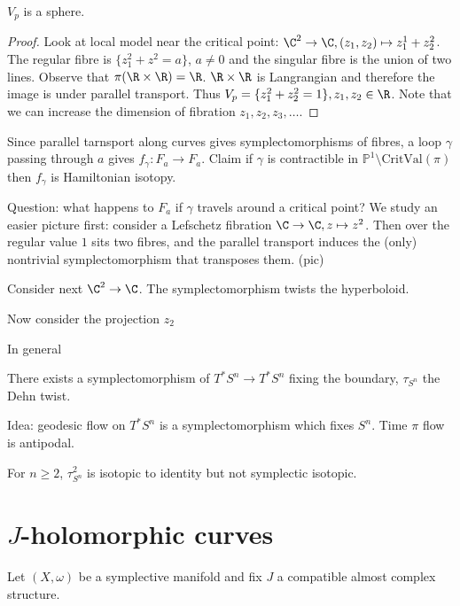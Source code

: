 \documentclass[a4paper]{article}
\renewcommand*{\P}{\mathbb{P}}
\begin{document}
\begin{proposition}
  \(V_p\) is a sphere.
\end{proposition}

\begin{proof}
  Look at local model near the critical point: \(\C^2 \to \C, (z_1, z_2) \mapsto z_1^1 + z_2^2\). The regular fibre is \(\{z_1^2 + z^2 = a\}\), \(a \ne 0\) and the singular fibre is the union of two lines. Observe that \(\pi(\R \times \R) = \R\). \(\R \times \R\) is Langrangian and therefore the image is under parallel transport. Thus \(V_p = \{z_1^2 + z_2^2 = 1\}, z_1, z_2 \in \R\). Note that we can increase the dimension of fibration \(z_1, z_2, z_3, \dots\).
\end{proof}

Since parallel tarnsport along curves gives symplectomorphisms of fibres, a loop \(\gamma\) passing through \(a\) gives \(f_\gamma: F_a \to F_a\). Claim if \(\gamma\) is contractible in \(\P^1 \setminus \mathrm{CritVal}(\pi)\) then \(f_\gamma\) is Hamiltonian isotopy.

Question: what happens to \(F_a\) if \(\gamma\) travels around a critical point? We study an easier picture first: consider a Lefschetz fibration \(\C \to \C, z \mapsto z^2\). Then over the regular value \(1\) sits two fibres, and the parallel transport induces the (only) nontrivial symplectomorphism that transposes them. (pic)

Consider next \(\C^2 \to \C\). The symplectomorphism twists the hyperboloid.

Now consider the projection \(z_2\)

In general

\begin{theorem}
  There exists a symplectomorphism of \(T^*S^n \to T^*S^n\) fixing the boundary, \(\tau_{S^n}\) the Dehn twist.
\end{theorem}

Idea: geodesic flow on \(T^*S^n\) is a symplectomorphism which fixes \(S^n\). Time \(\pi\) flow is antipodal.

For \(n \geq 2\), \(\tau_{S^n}^2\) is isotopic to identity but not symplectic isotopic.

\section{\(J\)-holomorphic curves}

Let \((X, \omega)\) be a symplective manifold and fix \(J\) a compatible almost complex structure.
\end{document}
